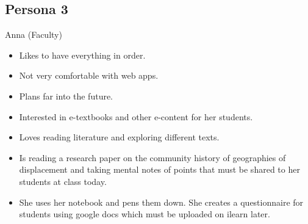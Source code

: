 \subsection{Persona 3}
\begin{description}[font=\bfseries\itshape]
\item[Actor:]Anna (Faculty)
\item[About:]\hfill
\begin{itemize}[leftmargin=0mm]
\item Likes to have everything in order.
\item Not very comfortable with web apps.
\item Plans far into the future.
\item Interested in e-textbooks and other e-content for her students.
\item Loves reading literature and exploring different texts.
\end{itemize}
\item[Goals \& Scenario:]\hfill
\begin{itemize}[leftmargin=0mm]
\item Is reading a research paper on the community history of geographies of displacement and taking mental notes of points that must be shared to her students at class today.
\item She uses her notebook and pens them down. She creates a questionnaire for students using google docs which must be uploaded on ilearn later.
\end{itemize}
\end{description}


